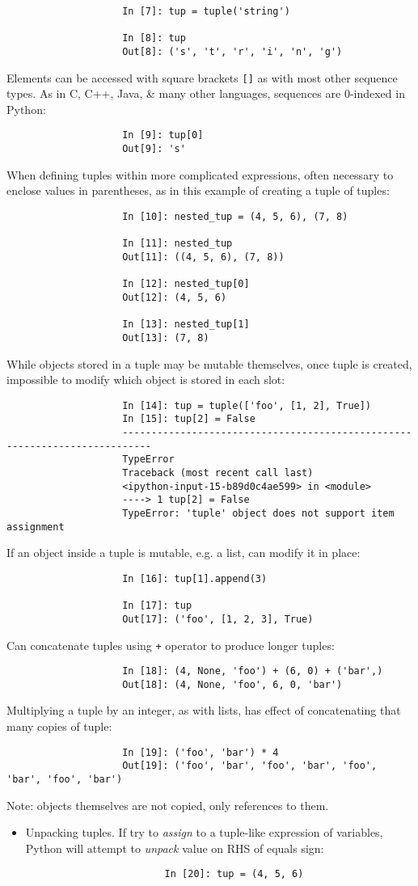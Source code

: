 \documentclass{article}
\begin{document}
\begin{enumerate}
\begin{itemize}
\begin{itemize}
\begin{itemize}
\begin{verbatim}
					In [7]: tup = tuple('string')
					
					In [8]: tup
					Out[8]: ('s', 't', 'r', 'i', 'n', 'g')
				\end{verbatim}
				Elements can be accessed with square brackets {\tt[]} as with most other sequence types. As in C, C++, Java, \& many other languages, sequences are 0-indexed in Python:
				\begin{verbatim}
					In [9]: tup[0]
					Out[9]: 's'
				\end{verbatim}
				When defining tuples within more complicated expressions, often necessary to enclose values in parentheses, as in this example of creating a tuple of tuples:
				\begin{verbatim}
					In [10]: nested_tup = (4, 5, 6), (7, 8)
					
					In [11]: nested_tup
					Out[11]: ((4, 5, 6), (7, 8))
					
					In [12]: nested_tup[0]
					Out[12]: (4, 5, 6)
					
					In [13]: nested_tup[1]
					Out[13]: (7, 8)
				\end{verbatim}
				While objects stored in a tuple may be mutable themselves, once tuple is created, impossible to modify which object is stored in each slot:
				\begin{verbatim}
					In [14]: tup = tuple(['foo', [1, 2], True])
					In [15]: tup[2] = False
					---------------------------------------------------------------------------
					TypeError
					Traceback (most recent call last)
					<ipython-input-15-b89d0c4ae599> in <module>
					----> 1 tup[2] = False
					TypeError: 'tuple' object does not support item assignment
				\end{verbatim}
				If an object inside a tuple is mutable, e.g. a list, can modify it in place:
				\begin{verbatim}
					In [16]: tup[1].append(3)
					
					In [17]: tup
					Out[17]: ('foo', [1, 2, 3], True)
				\end{verbatim}
				Can concatenate tuples using {\tt+} operator to produce longer tuples:
				\begin{verbatim}
					In [18]: (4, None, 'foo') + (6, 0) + ('bar',)
					Out[18]: (4, None, 'foo', 6, 0, 'bar')
				\end{verbatim}
				Multiplying a tuple by an integer, as with lists, has effect of concatenating that many copies of tuple:
				\begin{verbatim}
					In [19]: ('foo', 'bar') * 4
					Out[19]: ('foo', 'bar', 'foo', 'bar', 'foo', 'bar', 'foo', 'bar')
				\end{verbatim}
				Note: objects themselves are not copied, only references to them.
				\begin{itemize}
					\item {\sf Unpacking tuples.} If try to {\it assign} to a tuple-like expression of variables, Python will attempt to {\it unpack} value on RHS of equals sign:
					\begin{verbatim}
						In [20]: tup = (4, 5, 6)
						

\end{verbatim}
\end{itemize}
\end{itemize}
\end{itemize}
\end{itemize}
\end{enumerate}
\end{document}
